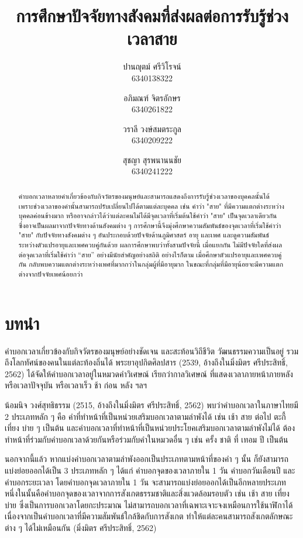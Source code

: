 \documentclass[a4paper]{article}
\title{การศึกษาปัจจัยทางสังคมที่ส่งผลต่อการรับรู้ช่วงเวลาสาย}
\author{
    ปานญุตม์ ศรีวิโรจน์\\6340138322
    \and
    อภิมณฑ์ จิตรอักษร\\6340261822
    \and
    วราลี วงษ์สมตระกูล\\6340209222
    \and
    สุชญา สุรพนานนชัย\\6340241222
}
\date{}
\begin{document}
\maketitle
\begin{abstract}
    คำบอกเวลาหลายคำเกี่ยวข้องกับกิจวัตรของมนุษย์และสามารถแสดงถึงการรับรู้ช่วงเวลาของบุคคลนั้นได้ เพราะช่วงเวลาของคำนั้นสามารถปรับเปลี่ยนไปได้ตามแต่ละบุคคล เช่น คำว่า "สาย" ที่มีความแตกต่างระหว่างบุคคลค่อนข้างมาก หรืออาจกล่าวได้ว่าแต่ละคนไม่ได้มีจุดเวลาที่เริ่มต้นใช้คำว่า "สาย" เป็นจุดเวลาเดียวกัน ซึ่งอาจเป็นผลมาจากปัจจัยทางด้านสังคมต่าง ๆ การศึกษานี้จึงมุ่งศึกษาความสัมพันธ์ของจุดเวลาที่เริ่มใช้คำว่า "สาย" กับปัจจัยทางสังคมต่าง ๆ อันประกอบด้วยปัจจัยด้านภูมิศาสตร์ อายุ และเพศ และดูความสัมพันธ์ระหว่างตัวแปรอายุและเพศควบคู่กันด้วย ผลการศึกษาพบว่าทั้งสามปัจจัยนี้ เมื่อแยกกัน ไม่มีปัจจัยใดที่ส่งผลต่อจุดเวลาที่เริ่มใช้คำว่า “สาย” อย่างมีนัยสำคัญอย่างสถิติ อย่างไรก็ตาม เมื่อศึกษาตัวแปรอายุและเพศควบคู่กัน กลับพบความแตกต่างระหว่างเพศที่มากกว่าในกลุ่มผู้ที่มีอายุมาก ในขณะที่กลุ่มที่มีอายุน้อยจะมีความแตกต่างจากปัจจัยเพศน้อยกว่า
\end{abstract}
\section{บทนำ}
    คำบอกเวลาเกี่ยวข้องกับกิจวัตรของมนุษย์อย่างชัดเจน และสะท้อนวิถีชีวิต วัฒนธรรมความเป็นอยู่ รวมถึงโลกทัศน์ของคนในแต่ละท้องถิ่นได้ พระยาอุปกิตศิลปสาร (2539, อ้างถึงในมิ่งมิตร ศรีประสิทธิ์, 2562) ได้จัดให้คำบอกเวลาอยู่ในหมวดคำวิเศษณ์ เรียกว่ากาลวิเศษณ์ ที่แสดงเวลาภายหน้าภายหลัง หรือเวลาปัจจุบัน หรือเวลาเร็ว ช้า ก่อน หลัง ฯลฯ

    น้อมนิจ วงศ์สุทธิธรรม (2515, อ้างถึงในมิ่งมิตร ศรีประสิทธิ์, 2562) พบว่าคำบอกเวลาในภาษาไทยมี 2 ประเภทหลัก ๆ คือ คำที่ทำหน้าที่เป็นหน่วยเสริมบอกเวลาตามลำพังได้ เช่น เช้า สาย ต่อไป ตะกี้ เที่ยง บ่าย ๆ เป็นต้น และคำบอกเวลาที่ทำหน้าที่เป็นหน่วยประโยคเสริมบอกเวลาตามลำพังไม่ได้ ต้องทำหน้าที่ร่วมกับคำบอกเวลาด้วยกันหรือร่วมกับคำในหมวดอื่น ๆ เช่น ครั้ง ชาติ ที่ เทอม ปี เป็นต้น

    นอกจากนี้แล้ว หากแบ่งคำบอกเวลาตามลำพังออกเป็นประเภทตามหน้าที่ของคำ ๆ นั้น ก็ยังสามารถแบ่งย่อยออกได้เป็น 3 ประเภทหลัก ๆ ได้แก่ คำบอกจุดของเวลาภายใน 1 วัน คำบอกวันเดือนปี และคำบอกระยะเวลา โดยคำบอกจุดเวลาภายใน 1 วัน จะสามารถแบ่งย่อยออกได้เป็นอีกหลายประเภท  หนึ่งในนั้นคือคำบอกจุดของเวลาจากการสังเกตธรรมชาติและสิ่งแวดล้อมรอบตัว เช่น เช้า สาย เที่ยง บ่าย ซึ่งเป็นการบอกเวลาโดยกะประมาณ ไม่สามารถบอกเวลาที่เฉพาะเจาะจงเหมือนการใช้นาฬิกาได้ เนื่องจากเป็นคำบอกเวลาที่มีความสัมพันธ์ใกล้ชิดกับการสังเกต ทำให้แต่ละคนสามารถสังเกตลักษณะต่าง ๆ ได้ไม่เหมือนกัน (มิ่งมิตร ศรีประสิทธิ์, 2562)
\end{document}

